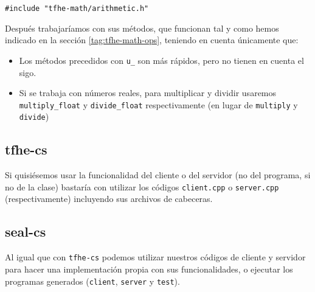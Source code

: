 \begin{verbatim}
#include "tfhe-math/arithmetic.h"
\end{verbatim}

Después trabajaríamos con sus métodos, que funcionan tal y como hemos indicado en la sección \ref{tag:tfhe-math-ops}, teniendo en cuenta únicamente que:

\begin{itemize}
    \item Los métodos precedidos con \verb|u_| son más rápidos, pero no tienen en cuenta el sigo.
    \item Si se trabaja con números reales, para multiplicar y dividir usaremos \verb|multiply_float| y \verb|divide_float| respectivamente (en lugar de \verb|multiply| y \verb|divide|)
\end{itemize}

\subsection{tfhe-cs}

Si quisiésemos usar la funcionalidad del cliente o del servidor (no del programa, si no de la clase) bastaría con utilizar los códigos \verb|client.cpp| o \verb|server.cpp| (respectivamente) incluyendo sus archivos de cabeceras.

\subsection{seal-cs}

Al igual que con \verb|tfhe-cs| podemos utilizar nuestros códigos de cliente y servidor para hacer una implementación propia con sus funcionalidades, o ejecutar los programas generados (\verb|client|, \verb|server| y \verb|test|).